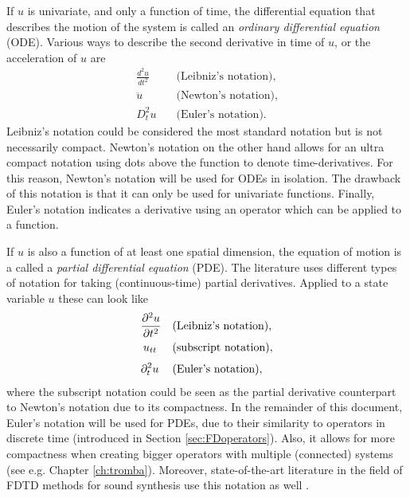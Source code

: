 If $u$ is univariate, and only a function of time, the differential equation that describes the motion of the system is called an \textit{ordinary differential equation} (ODE). Various ways to describe the second derivative in time of $u$, or the acceleration of $u$ are
%
\begin{equation}\nonumber
    \begin{aligned}
        \frac{d^2 u}{d t^2} & \quad \text{(Leibniz's notation)},\\
        \ddot u\ \  &\quad \text{(Newton's notation)},\\[3pt]
        D_t^2 u& \quad \text{(Euler's notation)}.
    \end{aligned}
\end{equation}
%
Leibniz's notation could be considered the most standard notation but is not necessarily compact. Newton's notation on the other hand allows for an ultra compact notation using dots above the function to denote time-derivatives. For this reason, Newton's notation will be used for ODEs in isolation. The drawback of this notation is that it can only be used for univariate functions. Finally, Euler's notation indicates a derivative using an operator which can be applied to a function. 
 
If $u$ is also a function of at least one spatial dimension, the equation of motion is a called a \textit{partial differential equation} (PDE).
The literature uses different types of notation for taking (continuous-time) partial derivatives. Applied to a state variable $u$ these can look like 
\begin{equation}\nonumber
    \begin{aligned}
        \frac{\partial^2 u}{\partial t^2} & \quad \text{(Leibniz's notation)},\\
        u_{tt}\:\,& \quad \text{(subscript notation)},\\[3pt]
        \partial_t^2 u\: & \quad \text{(Euler's notation)},
    \end{aligned}
\end{equation}
% 
%
%
where the subscript notation could be seen as the partial derivative counterpart to Newton's notation due to its compactness. In the remainder of this document, Euler's notation will be used for PDEs, due to their similarity to operators in discrete time (introduced in Section \ref{sec:FDoperators}). Also, it allows for more compactness when creating bigger operators with multiple (connected) systems (see e.g. Chapter \ref{ch:tromba}). Moreover, state-of-the-art literature in the field of FDTD methods for sound synthesis use this notation as well \cite{Bilbao2018}.

